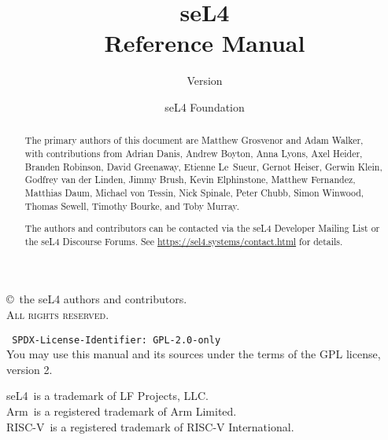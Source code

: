 \documentclass[english,a4paper,11pt,twoside\ifDraft,draft\fi]{report}
\date{}
\date{}
\newcommand{\version}{}
\newcommand{\rtm}{\textsuperscript{\textregistered}}
\begin{document}
  \title{seL4\\ Reference Manual}
  \subtitle{Version \version}

  \author{seL4 Foundation}
  \date{\commitdate}

  \maketitle

  \thispagestyle{empty}

  \vfill

  \parindent 0pt\parskip 6pt

  \copyright\ the seL4 authors and contributors.\\
  \textsc{All rights reserved}.

  \vspace{2ex}
  \texttt{%
  SPDX-License-Identifier: GPL-2.0-only
  }\\
  You may use this manual and its sources under the terms of the GPL license, version 2.

  \vspace{2ex}
  seL4\rtm\ is a trademark of LF Projects, LLC.\\
  Arm\rtm\ is a registered trademark of Arm Limited.\\
  RISC-V\rtm\ is a registered trademark of RISC-V International.

  \thispagestyle{empty}
  \vfill
  \renewcommand{\abstractname}{Acknowledgements}
  \begin{abstract}
The primary authors of this document are Matthew Grosvenor and Adam Walker,
with contributions from
Adrian Danis,
Andrew Boyton,
Anna Lyons,
Axel Heider,
Branden Robinson,
David Greenaway,
Etienne Le~Sueur,
Gernot Heiser,
Gerwin Klein,
Godfrey van der Linden,
Jimmy Brush,
Kevin Elphinstone,
Matthew Fernandez,
Matthias Daum,
Michael von Tessin,
Nick Spinale,
Peter Chubb,
Simon Winwood,
Thomas Sewell,
Timothy Bourke, and
Toby Murray.

The authors and contributors can be contacted via the seL4 Developer Mailing
List or the seL4 Discourse Forums. See \url{https://sel4.systems/contact.html}
for details.
  \end{abstract}
  \thispagestyle{empty}
\end{document}
